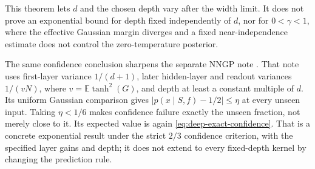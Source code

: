 This theorem lets $d$ and the chosen depth vary after the width
limit. It does not prove an exponential bound for depth fixed
independently of $d$, nor for $0<\gamma<1$, where the effective
Gaussian margin diverges and a fixed near-independence estimate
does not control the zero-temperature posterior.

The same confidence conclusion sharpens the separate NNGP note
\cite{nngp-note}. That note uses first-layer variance $1/(d+1)$,
later hidden-layer and readout variances $1/(vN)$, where
$v=\mathbb E\tanh^2(G)$, and depth at least a constant multiple of $d$.
Its uniform Gaussian comparison gives
$|p(x\mid S,f)-1/2|\le\eta$ at every unseen input.
Taking $\eta<1/6$ makes confidence failure exactly the unseen
fraction, not merely close to it. Its expected value is again
\eqref{eq:deep-exact-confidence}. That is a concrete exponential
result under the strict $2/3$ confidence criterion, with the specified
layer gains and depth; it does not extend to every fixed-depth
kernel by changing the prediction rule.
